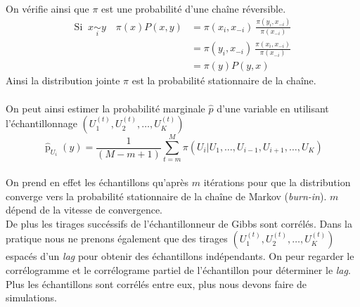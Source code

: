 \documentclass{article}
\theoremstyle{definition}
\theoremstyle{remark}
\begin{document}
\paragraph{}
On vérifie ainsi que $\pi$ est une probabilité d'une chaîne réversible.
$$
\begin{aligned}
	\text{Si } \ x \underset{i}{\sim} y \quad \pi(x) P(x,y) &= \pi(x_i,x_{-i})\ \frac{\pi(y_i, x_{-i})}{\pi(x_{-i})}  \\
	& = \pi(y_i,x_{-i})\ \frac{\pi(x_i, x_{-i})}{\pi(x_{-i})} \\ 
	&= \pi(y) P(y,x) 
\end{aligned}
$$
Ainsi la distribution jointe $\pi$ est la probabilité stationnaire de la chaîne.

\paragraph{}
On peut ainsi estimer la probabilité marginale $\hat{p}$ d'une variable en utilisant l'échantillonnage $(U_1^{(t)},U_2^{(t)},\ldots,U_K^{(t)})$ 
\[
\widehat{\operatorname{p}}_{U_{i}}(y)= \frac{1}
	{(M-m+1)} \sum_{t=m}^{M} \pi (U_i | U_1, \ldots, U_{i-1}, U_{i+1}, \ldots, U_K)
\]
\paragraph{}

On prend en effet les échantillons qu'après $m$ itérations pour que la distribution converge vers la probabilité stationnaire 
de la chaîne de Markov (\textit{burn-in}). $m$ dépend de la vitesse de convergence.\\

De plus les tirages succéssifs de l'échantillonneur de Gibbs sont corrélés. Dans la pratique nous ne prenons également que des tirages  
$\left(U_{1}^{(t)}, U_{2}^{(t)}, \ldots, U_{K}^{(t)}\right)$ espacés d'un \textit{lag} pour obtenir des échantillons indépendants.
On peur regarder le corrélogramme et le corrélograme partiel de l'échantillon pour déterminer le \textit{lag}. \\
Plus les échantillons sont corrélés entre eux, plus nous devons faire de simulations. 
\end{document}
